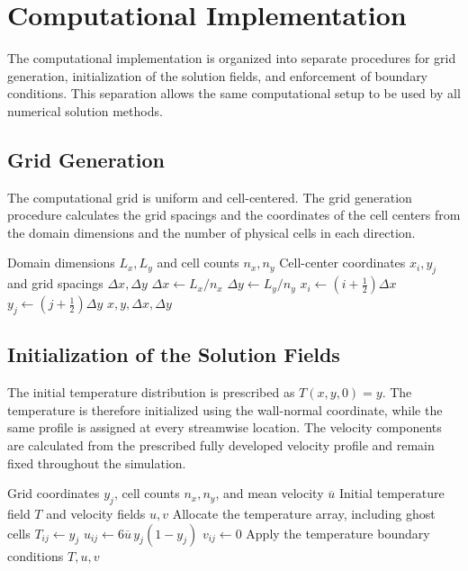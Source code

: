 \section{Computational Implementation}
\label{sec:computational_implementation}

The computational implementation is organized into separate
procedures for grid generation, initialization of the solution
fields, and enforcement of boundary conditions. This separation
allows the same computational setup to be used by all numerical
solution methods.

\subsection{Grid Generation}

The computational grid is uniform and cell-centered. The grid
generation procedure calculates the grid spacings and the
coordinates of the cell centers from the domain dimensions and
the number of physical cells in each direction.

\begin{algorithm}[H]
\caption{Grid Generation}
\label{alg:grid_generation}
\begin{algorithmic}[1]
\Require Domain dimensions $L_x,L_y$ and cell counts $n_x,n_y$
\Ensure Cell-center coordinates $x_i,y_j$ and grid spacings
$\Delta x,\Delta y$
\State $\Delta x \gets L_x/n_x$
\State $\Delta y \gets L_y/n_y$
    \State $x_i \gets (i+\frac{1}{2})\Delta x$
\EndFor
{}
    \State $y_j \gets (j+\frac{1}{2})\Delta y$
\EndFor
\State \Return $x,y,\Delta x,\Delta y$
\end{algorithmic}
\end{algorithm}

\subsection{Initialization of the Solution Fields}

The initial temperature distribution is prescribed as
$T(x,y,0)=y$. The temperature is therefore initialized using
the wall-normal coordinate, while the same profile is assigned
at every streamwise location. The velocity components are
calculated from the prescribed fully developed velocity profile
and remain fixed throughout the simulation.

\begin{algorithm}[H]
\caption{Initialization of Temperature and Velocity Fields}
\label{alg:field_initialization}
\begin{algorithmic}[1]
\Require Grid coordinates $y_j$, cell counts $n_x,n_y$,
and mean velocity $\overline{u}$
\Ensure Initial temperature field $T$ and velocity fields $u,v$
\State Allocate the temperature array, including ghost cells
    \State $T_{ij} \gets y_j$
    \State $u_{ij} \gets 6\overline{u}\,y_j(1-y_j)$
    \State $v_{ij} \gets 0$
\EndFor
\State Apply the temperature boundary conditions
\State \Return $T,u,v$
\end{algorithmic}
\end{algorithm}

